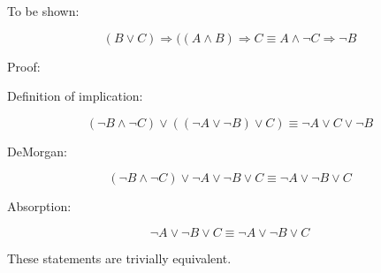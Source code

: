 To be shown:

$$ (B \lor C) \Rightarrow ((A \land B) \Rightarrow C \equiv A \land \neg C \Rightarrow \neg B $$

Proof:

Definition of implication:

$$ (\neg B \land \neg C) \lor ((\neg A \lor \neg B) \lor C) \equiv \neg A \lor C \lor \neg B $$

DeMorgan:

$$ (\neg B \land \neg C ) \lor \neg A \lor \neg B \lor C \equiv \neg A \lor \neg B \lor C $$

Absorption:

$$ \neg A \lor \neg B \lor C \equiv \neg A \lor \neg B \lor C $$

These statements are trivially equivalent.

\bye